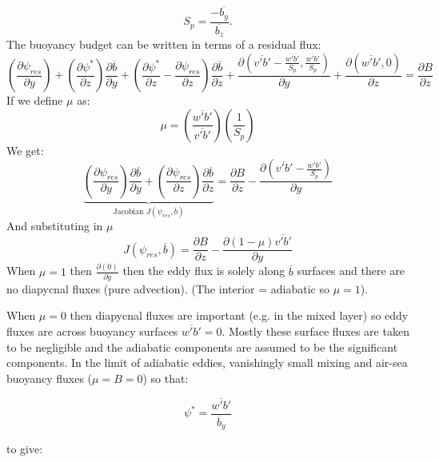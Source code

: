 \begin{equation}
S_p= \frac{-\overline{b_y}}{\overline{b_z}}.
\end{equation}
The buoyancy budget can be written in terms of a residual flux:
\begin{equation*}
(\frac{\partial \psi _{res}}{\partial y}) + (\frac{\partial \psi ^*}{\partial z}) \frac{\partial \overline{b}}{\partial y} + (\frac{\partial \psi ^*}{\partial z} -  \frac{\partial \psi _{res}}{\partial z})\frac{\partial \overline{b}}{\partial z} + \frac{\partial(\overline{v'b'}-\frac{\overline{w'b'}}{S_p},\frac{\overline{w'b'}}{S_p})}{\partial y}+ \frac{\partial (\overline{w'b'},0)}{\partial z}= \frac{\partial B}{\partial z}
\end{equation*}
If we define $\mu $ as:
\begin{equation*}
\mu=(\frac{\overline{w'b'}}{\overline{v'b'}})(\frac{1}{S_p})
\end{equation*}
We get:
\begin{equation*}
\underbrace{(\frac{\partial \psi _{res}}{\partial y}) \frac{\partial \overline{b}}{\partial y} + (\frac{\partial \psi _{res}}{\partial z})\frac{\partial \overline{b}}{\partial z}}_\text{Jacobian $J(\psi_{res} , \overline{b})$} = \frac{\partial B}{\partial z} - \frac{\partial (\overline{v'b'}-\frac{\overline{w'b'}}{S_p})}{\partial y}
\end{equation*}
And substituting in $\mu$ 
\begin{equation}
J(\psi_{res} , \overline{b}) = \frac{\partial B}{\partial z} - \frac{\partial (1-\mu )\overline{v'b'}}{\partial y}
\label{eq:mr03bbudget}
\end{equation}
When $\mu = 1$ then $\frac{\partial (0)}{\partial y}$ then the eddy flux is solely along $\overline{b}$ surfaces and there are no diapycnal fluxes (pure advection). (The interior = adiabatic so $\mu = 1 $). 

When $ \mu = 0 $ then diapycnal fluxes are important (e.g. in the mixed layer) so eddy fluxes are across buoyancy surfaces $ \overline{w'b'} = 0$. Mostly these surface fluxes are taken to be negligible and the adiabatic components are assumed to be the significant components. In the limit of adiabatic eddies, vanishingly small mixing and air-sea buoyancy fluxes ($\mu = B = 0$) so that:

\begin{equation}
\psi ^* = \frac{\overline{w'b'}}{\overline{b}_y}
\end{equation} 

to give:


